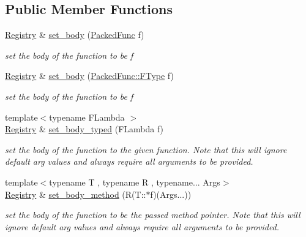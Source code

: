 \subsection*{Public Member Functions}
\begin{DoxyCompactItemize}
\item 
\hyperlink{classtvm_1_1runtime_1_1Registry}{Registry} \& \hyperlink{classtvm_1_1runtime_1_1Registry_aed802ed365a13a9cef9de4e9f601b62a}{set\+\_\+body} (\hyperlink{classtvm_1_1runtime_1_1PackedFunc}{Packed\+Func} f)
\begin{DoxyCompactList}\small\item\em set the body of the function to be f \end{DoxyCompactList}\item 
\hyperlink{classtvm_1_1runtime_1_1Registry}{Registry} \& \hyperlink{classtvm_1_1runtime_1_1Registry_aa093c769200bbf53e1c5911bd1be5568}{set\+\_\+body} (\hyperlink{classtvm_1_1runtime_1_1PackedFunc_ae5f951a6a515f3e3a7493c27704b7849}{Packed\+Func\+::\+F\+Type} f)
\begin{DoxyCompactList}\small\item\em set the body of the function to be f \end{DoxyCompactList}\item 
{\footnotesize template$<$typename F\+Lambda $>$ }\\\hyperlink{classtvm_1_1runtime_1_1Registry}{Registry} \& \hyperlink{classtvm_1_1runtime_1_1Registry_a607848df01d8c33d7e2cf40e7dae42b1}{set\+\_\+body\+\_\+typed} (F\+Lambda f)
\begin{DoxyCompactList}\small\item\em set the body of the function to the given function. Note that this will ignore default arg values and always require all arguments to be provided. \end{DoxyCompactList}\item 
{\footnotesize template$<$typename T , typename R , typename... Args$>$ }\\\hyperlink{classtvm_1_1runtime_1_1Registry}{Registry} \& \hyperlink{classtvm_1_1runtime_1_1Registry_ae5f7cc19067b609a79e1bb32b7b6f086}{set\+\_\+body\+\_\+method} (R(T\+::$\ast$f)(Args...))
\begin{DoxyCompactList}\small\item\em set the body of the function to be the passed method pointer. Note that this will ignore default arg values and always require all arguments to be provided. \end{DoxyCompactList}\item 

\end{DoxyCompactItemize}
